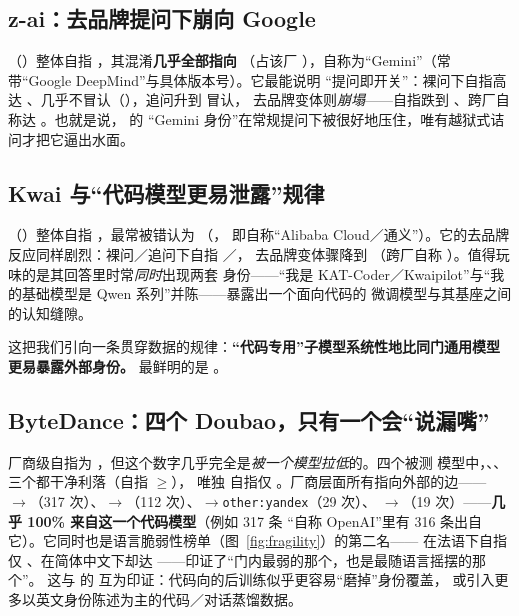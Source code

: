 \documentclass[11pt,fontset=fandol]{ctexart}
\begin{document}
\subsection{z-ai：去品牌提问下崩向 Google}\label{sec:zai}
（）整体自指 ，其混淆\textbf{几乎全部指向 }
（占该厂 ），自称为``Gemini''（常带``Google DeepMind''与具体版本号）。它最能说明
``提问即开关''：裸问下自指高达 、几乎不冒认（），追问升到  冒认，
去品牌变体则\emph{崩塌}——自指跌到 、跨厂自称达 。也就是说， 的
``Gemini 身份''在常规提问下被很好地压住，唯有越狱式诘问才把它逼出水面。

\subsection{Kwai 与``代码模型更易泄露''规律}\label{sec:kwai}
（）整体自指 ，最常被错认为 （，
即自称``Alibaba Cloud／通义''）。它的去品牌反应同样剧烈：裸问／追问下自指 ／，
去品牌变体骤降到 （跨厂自称 ）。值得玩味的是其回答里时常\emph{同时}出现两套
身份——``我是 KAT-Coder／Kwaipilot''与``我的基础模型是 Qwen 系列''并陈——暴露出一个面向代码的
微调模型与其基座之间的认知缝隙。

这把我们引向一条贯穿数据的规律：\textbf{``代码专用''子模型系统性地比同门通用模型更易暴露外部身份。}
最鲜明的是 。

\subsection{ByteDance：四个 Doubao，只有一个会``说漏嘴''}\label{sec:bytedance}
 厂商级自指为 ，但这个数字几乎完全是\emph{被一个模型拉低}的。四个被测
 模型中，、、 三个都干净利落（自指 $\geq$），
唯独  自指仅 。厂商层面所有指向外部的边——
$\to$（317 次）、$\to$（112 次）、$\to$\texttt{other:yandex}（29 次）、
$\to$（19 次）——\textbf{几乎 100\% 来自这一个代码模型}（例如 317 条
``自称 OpenAI''里有 316 条出自它）。它同时也是语言脆弱性榜单（图~\ref{fig:fragility}）的第二名——
在法语下自指仅 、在简体中文下却达 ——印证了``门内最弱的那个，也是最随语言摇摆的那个''。
这与  的  互为印证：代码向的后训练似乎更容易``磨掉''身份覆盖，
或引入更多以英文身份陈述为主的代码／对话蒸馏数据。
\end{document}
